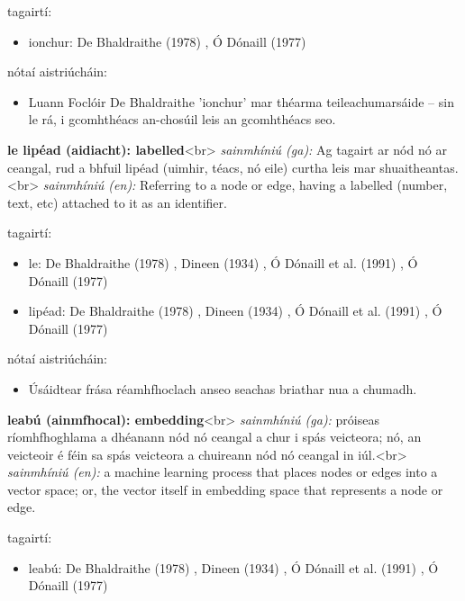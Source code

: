 \documentclass{article}
\begin{document}
tagairtí:
\begin{itemize}
	\item ionchur: De Bhaldraithe (1978) \cite{de-bhaldraithe}, Ó Dónaill (1977) \cite{odonaill}
\end{itemize}

nótaí aistriúcháin:
\begin{itemize}
	\item Luann Foclóir De Bhaldraithe 'ionchur' mar théarma teileachumarsáide -- sin le rá, i gcomhthéacs an-chosúil leis an gcomhthéacs seo.
\end{itemize}


\textbf{le lipéad (aidiacht): labelled}<br>
\textit{sainmhíniú (ga):} Ag tagairt ar nód nó ar ceangal, rud a bhfuil lipéad (uimhir, téacs, nó eile) curtha leis mar shuaitheantas.<br>
\textit{sainmhíniú (en):} Referring to a node or edge, having a labelled (number, text, etc) attached to it as an identifier.

tagairtí:
\begin{itemize}
	\item le: De Bhaldraithe (1978) \cite{de-bhaldraithe}, Dineen (1934) \cite{dineen}, Ó Dónaill et al. (1991) \cite{focloir-beag}, Ó Dónaill (1977) \cite{odonaill}
	\item lipéad: De Bhaldraithe (1978) \cite{de-bhaldraithe}, Dineen (1934) \cite{dineen}, Ó Dónaill et al. (1991) \cite{focloir-beag}, Ó Dónaill (1977) \cite{odonaill}
\end{itemize}

nótaí aistriúcháin:
\begin{itemize}
	\item Úsáidtear frása réamhfhoclach anseo seachas briathar nua a chumadh.
\end{itemize}


\textbf{leabú (ainmfhocal): embedding}<br>
\textit{sainmhíniú (ga):} próiseas ríomhfhoghlama a dhéanann nód nó ceangal a chur i spás veicteora; nó, an veicteoir é féin sa spás veicteora a chuireann nód nó ceangal in iúl.<br>
\textit{sainmhíniú (en):} a machine learning process that places nodes or edges into a vector space; or, the vector itself in embedding space that represents a node or edge.

tagairtí:
\begin{itemize}
	\item leabú: De Bhaldraithe (1978) \cite{de-bhaldraithe}, Dineen (1934) \cite{dineen}, Ó Dónaill et al. (1991) \cite{focloir-beag}, Ó Dónaill (1977) \cite{odonaill}
\end{itemize}
\end{document}
